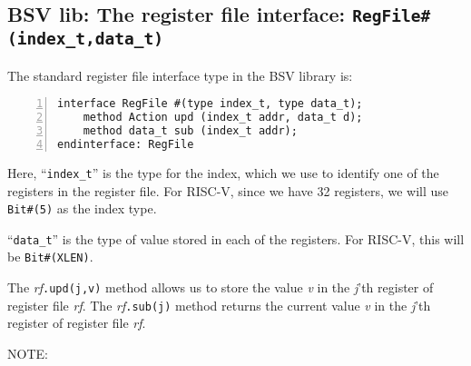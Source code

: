 
\subsection{BSV lib: The register file interface: {\tt RegFile\#(index\_t,data\_t)}}

\label{Sec_RegFile_interface}



The standard register file interface type in the BSV library is:

{\small
\begin{Verbatim}[frame=single, numbers=left]
interface RegFile #(type index_t, type data_t);
    method Action upd (index_t addr, data_t d);
    method data_t sub (index_t addr);
endinterface: RegFile
\end{Verbatim}
}

Here, ``\verb|index_t|'' is the type for the index, which we use to
identify one of the registers in the register file.  For RISC-V, since
we have 32 registers, we will use \verb|Bit#(5)| as the index type.

``\verb|data_t|'' is the type of value stored in each of the
registers.  For RISC-V, this will be \verb|Bit#(XLEN)|.

The \emph{rf}{\tt.upd(j,v)} method allows us to store the value
\emph{v} in the \emph{j}'th register of register file \emph{rf}.  The
\emph{rf}{\tt.sub(j)} method returns the current value \emph{v} in the
\emph{j}'th register of register file \emph{rf}.

\vspace{2ex}

NOTE:

